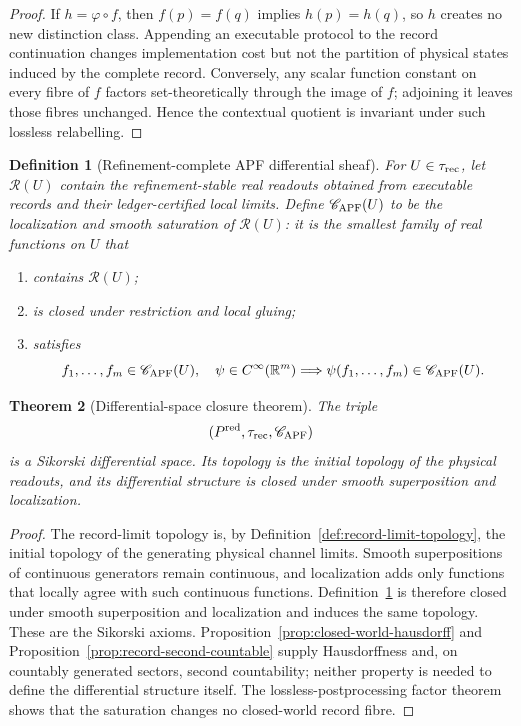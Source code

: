 \documentclass[11pt]{article}
\newtheorem{theorem}{Theorem}[section]
\newtheorem{definition}[theorem]{Definition}
\theoremstyle{remark}
\begin{document}
\begin{proof}
If $h=\varphi\circ f$, then $f(p)=f(q)$ implies $h(p)=h(q)$, so $h$ creates no
new distinction class.  Appending an executable protocol to the record
continuation changes implementation cost but not the partition of physical
states induced by the complete record.  Conversely, any scalar function
constant on every fibre of $f$ factors set-theoretically through the image of
$f$; adjoining it leaves those fibres unchanged.  Hence the contextual
quotient is invariant under such lossless relabelling.
\end{proof}

\begin{definition}[Refinement-complete APF differential sheaf]
\label{def:record-sheaf}
For $U\in\tau_{\rm rec}$, let $\mathscr R(U)$ contain the refinement-stable
real readouts obtained from executable records and their ledger-certified
local limits.  Define $\mathscr C_{\rm APF}(U)$ to be the localization and
smooth saturation of $\mathscr R(U)$: it is the smallest family of real
functions on $U$ that
\begin{enumerate}[label=(\roman*)]
\item contains $\mathscr R(U)$;
\item is closed under restriction and local gluing;
\item satisfies
\[
f_1,\ldots,f_m\in\mathscr C_{\rm APF}(U),\quad
\psi\in C^\infty(\mathbb R^m)
\Longrightarrow
\psi(f_1,\ldots,f_m)\in\mathscr C_{\rm APF}(U).
\]
\end{enumerate}
\end{definition}

\begin{theorem}[Differential-space closure theorem]
\label{thm:apf-cinfty-closure}
The triple
\[
(P^{\rm red},\tau_{\rm rec},\mathscr C_{\rm APF})
\]
is a Sikorski differential space.  Its topology is the initial topology of the
physical readouts, and its differential structure is closed under smooth
superposition and localization.
\end{theorem}

\begin{proof}
The record-limit topology is, by Definition~\ref{def:record-limit-topology},
the initial topology of the generating physical channel limits.  Smooth
superpositions of continuous generators remain continuous, and localization
adds only functions that locally agree with such continuous functions.
Definition~\ref{def:record-sheaf} is therefore closed under smooth
superposition and localization and induces the same topology.  These are the
Sikorski axioms.  Proposition~\ref{prop:closed-world-hausdorff} and
Proposition~\ref{prop:record-second-countable} supply Hausdorffness and, on
countably generated sectors, second countability; neither property is needed
to define the differential structure itself.  The lossless-postprocessing
factor theorem shows that the saturation changes no closed-world record fibre.
\end{proof}
\end{document}
